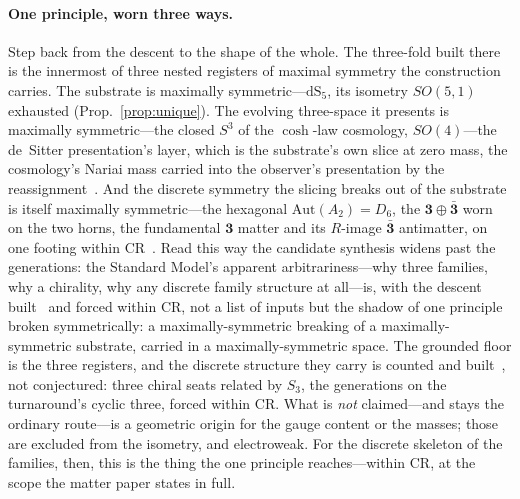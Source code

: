 \documentclass[11pt,a4paper]{article}
\theoremstyle{definition}
\begin{document}
\paragraph{One principle, worn three ways.} Step back from the descent to the shape of the whole. The three-fold built there~\cite{JanzenMatter} is the innermost of three nested registers of maximal symmetry the construction carries. The substrate is maximally symmetric---$\mathrm{dS}_5$, its isometry $SO(5,1)$ exhausted (Prop.~\ref{prop:unique}). The evolving three-space it presents is maximally symmetric---the closed $S^3$ of the $\cosh$-law cosmology, $SO(4)$---the de~Sitter presentation's layer, which is the substrate's own slice at zero mass, the cosmology's Nariai mass carried into the observer's presentation by the reassignment~\cite{JanzenOperator,JanzenCRcosmology}. And the discrete symmetry the slicing breaks out of the substrate is itself maximally symmetric---the hexagonal $\mathrm{Aut}(A_2)=D_6$, the $\mathbf 3\oplus\bar{\mathbf 3}$ worn on the two horns, the fundamental $\mathbf 3$ matter and its $R$-image $\bar{\mathbf 3}$ antimatter, on one footing within CR~\cite{JanzenMatter,JanzenBoundary}. Read this way the candidate synthesis widens past the generations: the Standard Model's apparent arbitrariness---why three families, why a chirality, why any discrete family structure at all---is, with the descent built~\cite{JanzenMatter} and forced within CR, not a list of inputs but the shadow of one principle broken symmetrically: a maximally-symmetric breaking of a maximally-symmetric substrate, carried in a maximally-symmetric space. The grounded floor is the three registers, and the discrete structure they carry is counted and built~\cite{JanzenMatter}, not conjectured: three chiral seats related by $S_3$, the generations on the turnaround's cyclic three, forced within CR. What is \emph{not} claimed---and stays the ordinary route---is a geometric origin for the gauge content or the masses; those are excluded from the isometry, and electroweak. For the discrete skeleton of the families, then, this is the thing the one principle reaches---within CR, at the scope the matter paper states in full.
\end{document}
